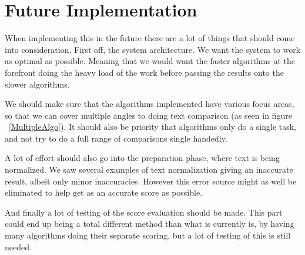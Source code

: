 \chapter{Future Implementation}
When implementing this in the future there are a lot of things that should come into consideration. First off, the system architecture. We want the system to work as optimal as possible. Meaning that we would want the faster algorithms at the forefront doing the heavy load of the work before passing the results onto the slower algorithms. 

We should make sure that the algorithms implemented have various focus areas, so that we can cover multiple angles to doing text comparison (as seen in figure ~\ref{MultipleAlgo}). It should also be priority that algorithms only do a single task, and not try to do a full range of comparisons single handedly.

A lot of effort should also go into the preparation phase, where text is being normalized. We saw several examples of text normalization giving an inaccurate result, albeit only minor inaccuracies. However this error source might as well be eliminated to help get as an accurate score as possible.

And finally a lot of testing of the score evaluation should be made. This part could end up being a total different method than what is currently is, by having many algorithms doing their separate scoring, but a lot of testing of this is still needed.